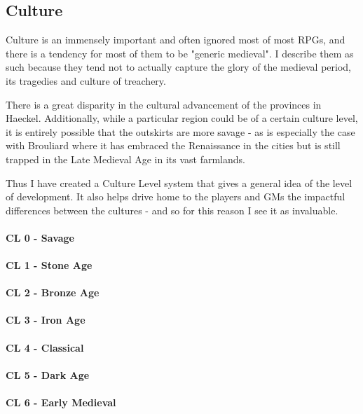\begin{multicols}{2}
\section{Culture}
Culture is an immensely important and often ignored most of most RPGs, and there is a tendency for most of them to be "generic medieval". I describe them as such because they tend not to actually capture the glory of the medieval period, its tragedies and culture of treachery. 

There is a great disparity in the cultural advancement of the provinces in Haeckel. Additionally, while a particular region could be of a certain culture level, it is entirely possible that the outskirts are more savage - as is especially the case with Brouliard where it has embraced the Renaissance in the cities but is still trapped in the Late Medieval Age in its vast farmlands. 

Thus I have created a Culture Level system that gives a general idea of the level of development. It also helps drive home to the players and GMs the impactful differences between the cultures - and so for this reason I see it as invaluable. 

\paragraph{CL 0 - Savage}

\paragraph{CL 1 - Stone Age}

\paragraph{CL 2 - Bronze Age}

\paragraph{CL 3 - Iron Age}

\paragraph{CL 4 - Classical}

\paragraph{CL 5 - Dark Age}

\paragraph{CL 6 - Early Medieval} 


\end{multicols}
